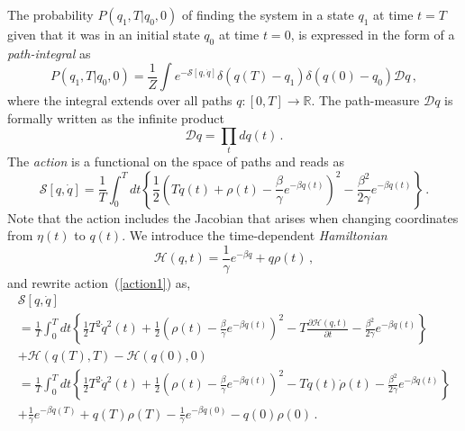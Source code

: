 \documentclass[12pt,a4paper,final]{iopart}
\newcommand{\dt}{\mathit{dt}}
\begin{document}
The probability $P(q_1,T|q_0,0)$ of finding the system in a state $q_1$ at time $t = T$ given that it was in an initial state $q_0$ at time $t = 0$, is expressed in the form of a {\em path-integral} as
\begin{equation}\label{pathint}
P(q_1,T|q_0,0)
=
\frac{1}{Z}
\int
e^{-{\mathcal S}[q,\dot q]}
\delta(q(T)-q_1)
\delta(q(0)-q_0)
\mathcal{D}q \,,
\end{equation}
where the integral extends over all paths $q:[0,T]\rightarrow \mathbb R$.
The path-measure $\mathcal Dq$ is formally written as the infinite product
\begin{equation}\label{pathmeasure_q}
{\mathcal Dq}
=
\prod_{t}
dq(t)\,.
\end{equation}
The {\em action} is a functional on the space of paths and reads as \cite{lau_2007}
\begin{equation}\label{action1}
{\mathcal S}[{q},\dot q]
=
\frac{1}{T}
\int_0^T \dt \left\{
\frac{1}{2}
\left(
    T\dot q(t)
    +
    \rho(t)
    -
    \frac{\beta}{\gamma}e^{-\beta q(t)}\right)^2
    -
    \frac{\beta^2}{2\gamma}e^{-\beta q(t)}
\right\} \,.
\end{equation}
Note that the action includes the Jacobian that arises when changing coordinates from ${\eta(t)}$ to $q(t)$.
We introduce the time-dependent {\em Hamiltonian}
\begin{equation}\label{H}
  \mathcal{H}(q,t)
  =
  \frac{1}{\gamma}e^{-\beta q}+q\rho(t)\,,
\end{equation}
and rewrite action~(\ref{action1}) as,
\begin{eqnarray}\label{action}
{\mathcal S}[{q},\dot q] \nonumber
\\
= \frac{1}{T}
\int_0^T dt\left\{
    \frac{1}{2}
    T^2\dot q^2(t) +
    \frac{1}{2}
    \left(\rho(t)-\frac{\beta}{\gamma}e^{-\beta q(t)}\right)^2 -
    T\frac{\partial \mathcal{H}(q,t)}{\partial t} -
    \frac{\beta^2}{2\gamma}e^{-\beta q(t)}
\right\} \nonumber
\\
+ \mathcal{H}(q(T),T) - \mathcal{H}(q(0),0) \nonumber
\\
= \frac{1}{T}
\int_0^T dt\left\{
    \frac{1}{2}
    T^2\dot q^2(t) +
    \frac{1}{2}
    \left(\rho(t)-\frac{\beta}{\gamma}e^{-\beta q(t)}\right)^2 -
    Tq(t)\dot\rho(t) -
     \frac{\beta^2}{2\gamma}e^{-\beta q(t)}
\right\}  \nonumber
\\
+
    \frac{1}{\gamma}e^{-\beta q(T)}+q(T)\rho(T)
   -\frac{1}{\gamma}e^{-\beta q(0)}-q(0)\rho(0)
\,.
\end{eqnarray}
\end{document}
